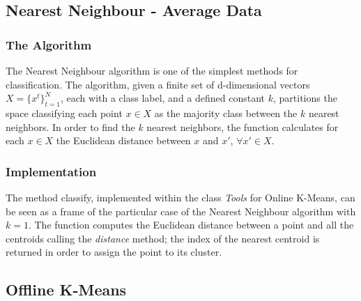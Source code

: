 \documentclass{lmproj}
\begin{document}
\subsection{Nearest Neighbour - Average Data}
\subsubsection{The Algorithm}
The Nearest Neighbour algorithm is one of the simplest methods for classification. The algorithm, given a finite set of d-dimensional vectors $X=\{x^t\}_{t=1}^{N}$, each with a class label, and a defined constant $k$, partitions the space classifying each point $x \in X$ as the majority class between the $k$ nearest neighbors. In order to find the $k$ nearest neighbors, the function calculates for each $x \in X$ the Euclidean distance between $x$ and $x'$, $\forall x' \in X$.

\subsubsection{Implementation}
The method classify, implemented within the class \textit{Tools} for Online K-Means, can be seen as a frame of the particular case of the Nearest Neighbour algorithm with $k=1$. The function computes the Euclidean distance between a point and all the centroids calling the \textit{distance} method; the index of the nearest centroid is returned in order to assign the point to its cluster.


\subsection{Offline K-Means}
\end{document}
